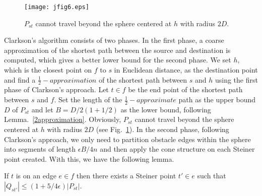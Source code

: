\documentclass{llncs}
\begin{document}
\begin{figure}\begin{center}
    \leavevmode
\texttt{[image: jfig6.eps]}
    \caption{$P_{st}$ cannot travel beyond the sphere  centered at $h$ with radius $2D$.}
    \label{jfig6}
    \end{center}
\end{figure}

Clarkson's algorithm consists of two phases. In the first phase, a coarse approximation of
the shortest path between the source and destination is computed, which gives a better lower bound
for the second phase. We set $h$, which is the closest point on $f$ to $s$ in Euclidean distance,
as the destination point and find a $\frac{1}{2}-approximation$ of the shortest path between $s$
and $h$ using
the first phase of Clarkson's approach. Let $t\in f$ be the end point of the shortest path between
$s$ and $f$. Set the length of the $\frac{1}{2}-approximate$ path as the upper bound $D$ of $P_{st}$
and let $B=D/2(1+1/2)$ as the lower bound, following Lemma.~\ref{2approximation}. Obviously, $P_{st}$ cannot
travel beyond the sphere centered at $h$ with radius $2D$ (see Fig.~\ref{jfig6}). In the second phase,
following Clarkson's approach, we only need to partition obstacle edges within the sphere into
segments of length $\epsilon B/4n$ and then apply the cone structure on each Steiner point created.
With this, we have the following lemma.

\begin{lemma}
\label{lemma-edge}
If $t$ is on an edge $e \in f$ then there exists a Steiner point $t' \in e$ such that
$|Q_{st'}| \le (1+5/4 \epsilon) |P_{st}|$.
\end{lemma}
\end{document}
